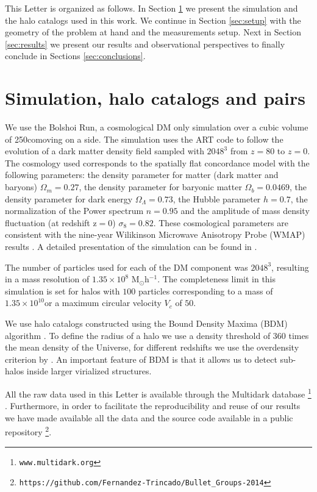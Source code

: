 \documentclass{emulateapj}
\newcommand{\hMpc}{{\ifmmode{h^{-1}{\rm Mpc}}\else{$h^{-1}$Mpc }\fi}}
\newcommand{\hMsun}{{\ifmmode{h^{-1}{\rm {M_{\odot}}}}\else{$h^{-1}{\rm{M_{\odot}}}$}\fi}}
\newcommand{\kms}{{\ifmmode{{\mathrm{\,km\ s}^{-1}}}\else{\,km~s$^{-1}$}\fi}}
\begin{document}
This Letter is organized as follows. In Section
\ref{sec:simulation} we present the simulation and the halo catalogs
used in this work. We continue in Section \ref{sec:setup} with the
geometry of the problem at hand and the measurements setup. Next in
Section \ref{sec:results} we present our results and observational
perspectives to finally conclude in Sections \ref{sec:conclusions}. 


\section{Simulation, halo catalogs and pairs}
\label{sec:simulation}

We use the Bolshoi Run, a cosmological DM only simulation over a cubic
volume of 250\hMpc comoving on a side. The simulation uses the ART code to
follow the evolution of a dark matter density field sampled with
$2048^3$ from $z=80$ to $z=0$. The cosmology used  corresponds
to  the spatially flat concordance model with the following
parameters:  the density parameter for matter (dark matter and baryons)
$\Omega_m=0.27$, the density parameter for baryonic matter
$\Omega_b=0.0469$, the density parameter for dark energy
$\Omega_{\Lambda}=0.73$, the Hubble parameter $h=0.7$, the
normalization of the Power spectrum $n=0.95$ and the amplitude of mass
density fluctuation (at redshift z$=$0) $\sigma_8=0.82$.  These
cosmological parameters are consistent with the nine-year Wilikinson
Microwave Anisotropy Probe (WMAP) results \citep{hinshaw_etal13}. A
detailed presentation of the simulation can be found in
\citet{2011ApJ...740..102K}.     


The number of particles used for each of the DM component was
$2048^3$, resulting in a mass resolution of $1.35 \times 10^8$
M$_{\odot}$h$^{-1}$. The completeness limit in this simulation is set
for halos with $100$ particles corresponding to a mass of
$1.35\times10^{10}$\hMsun or a maximum circular velocity $V_{c}$ of
$50$\kms. 

We use halo catalogs constructed using the Bound Density Maxima (BDM)
algorithm \citep{BDM,BDMb}. To define the radius of a halo we use a
density threshold of 360 times the mean density of the Universe, for 
different redshifts we use the overdensity criterion by
\cite{Bryan1998}. An important feature of BDM is that it allows us to
detect sub-halos inside larger virialized structures. 


All the raw data used in this Letter is
available through the Multidark database \footnote{\texttt{www.multidark.org}}
\citep{Riebe2013}.  Furthermore, in order to facilitate the
reproducibility and reuse of our results we have made available all
the data and the source code available in a public
repository \footnote{\texttt{https://github.com/Fernandez-Trincado/Bullet\_Groups-2014}}.
\end{document}
